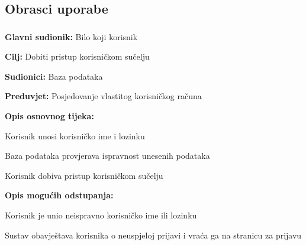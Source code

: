 				
			\subsection{Obrasci uporabe}
				
				\subsubsection{}

					\noindent {}
					\begin{packed_item}
	
						\item \textbf{Glavni sudionik:} Bilo koji korisnik
						\item  \textbf{Cilj:} Dobiti pristup korisničkom sučelju
						\item  \textbf{Sudionici:} Baza podataka
						\item  \textbf{Preduvjet:} Posjedovanje vlastitog korisničkog računa
						\item  \textbf{Opis osnovnog tijeka:}
						
						\item[] \begin{packed_enum}
	
							\item Korisnik unosi korisničko ime i lozinku
							\item Baza podataka provjerava ispravnost unesenih podataka
							\item Korisnik dobiva pristup korisničkom sučelju

						\end{packed_enum}
						
						\item  \textbf{Opis mogućih odstupanja:}
						
						\item[] \begin{packed_item}
	
							\item[2.a] Korisnik je unio neispravno korisničko ime ili lozinku
							\item[] \begin{packed_enum}
								
								\item Sustav obavještava korisnika o neuspjeloj prijavi i vraća ga na stranicu za prijavu
								
							\end{packed_enum}
							
						\end{packed_item}

					\end{packed_item}


